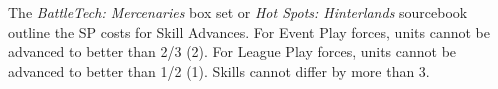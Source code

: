 The \emph{BattleTech: Mercenaries} box set or \emph{Hot Spots: Hinterlands} sourcebook outline the SP costs for Skill Advances.
For Event Play forces, units cannot be advanced to better than 2/3 (2).
For League Play forces, units cannot be advanced to better than 1/2 (1).
Skills cannot differ by more than 3.
